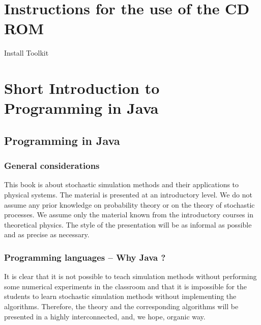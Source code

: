 \chapter*{Instructions for the use of the CD ROM}
Install Toolkit




\chapter{Short Introduction to Programming in Java}
\label{chap:IntroJava}

\section{Programming in Java}
\label{sec:Programming}


\subsection{General considerations}
\label{sec:General_considerations}
This book is about stochastic simulation methods and their applications to
physical systems. The material is presented at an introductory level. We do 
not assume any prior knowledge on probability theory or on the theory of 
stochastic processes. We assume only the material known from the introductory 
courses in theoretical physics. The style of the presentation will be as 
informal as possible and as precise as necessary.



\subsection{Programming languages -- Why Java ?}
\label{sec:Programming_languages}
It is clear that it is not possible to teach simulation methods without 
performing some numerical experiments in the classroom and that it is 
impossible for the students to learn stochastic simulation methods without 
implementing the algorithms. Therefore, the theory and the corresponding 
algorithms will be presented in a highly interconnected, and, we 
hope, organic way.

